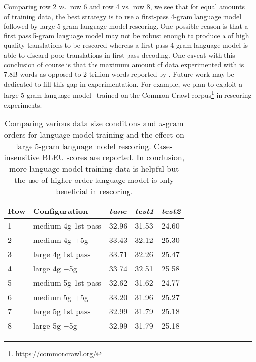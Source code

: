 Comparing row 2 vs.\ row 6 and row 4 vs.\ row 8, we see
that for equal amounts of training data, the best strategy
is to use a first-pass 4-gram language model followed by
large 5-gram language model rescoring. One possible reason
is that a first pass 5-gram language model may not be robust enough
to produce a of high quality translations to be rescored whereas
a first pass 4-gram language model is able to discard poor translations in first pass
decoding.
One caveat with this
conclusion of course is that the maximum amount of data experimented
with is 7.8B words as opposed to 2 trillion words reported
by \citet{brants-popat-xu-och-dean:2007:EMNLP-CoNLL}. Future work may be dedicated to fill this gap in experimentation.
For example, we plan to exploit a large 5-gram language model~\citep{buck-heafield-vanooyen:2014:LREC}
trained on the Common Crawl corpus\footnote{\url{https://commoncrawl.org/}}
in rescoring experiments.
%
\begin{table}
  \begin{center}
    \begin{tabular}{l|l|lll}
      Row & Configuration & \emph{tune} & \emph{test1} & \emph{test2} \\
      \hline
      1 & medium 4g 1st pass & 32.96 & 31.53 & 24.60 \\
      2 & medium 4g +5g &       33.43 & 32.12 & 25.30 \\
      \hline
      3 & large 4g 1st pass  & 33.71 & 32.26 & 25.47 \\
      4 & large 4g +5g       & 33.74 & 32.51 & 25.58 \\
      \hline
      5 & medium 5g 1st pass & 32.62 & 31.62 & 24.77 \\
      6 & medium 5g +5g       & 33.20 & 31.96 & 25.27 \\
      \hline
      7 & large 5g 1st pass  & 32.99 & 31.79 & 25.18 \\
      8 & large 5g +5g       & 32.99 & 31.79 & 25.18 \\
    \end{tabular}
    \caption{Comparing various data size conditions and $n$-gram orders
      for language model training and the effect on large 5-gram language
      model rescoring. Case-insensitive BLEU scores are reported.
      In conclusion, more language
      model training data is helpful but the use of higher order language
      model is only beneficial in rescoring.}
    \label{tab:lmSizes}
  \end{center}
\end{table}

